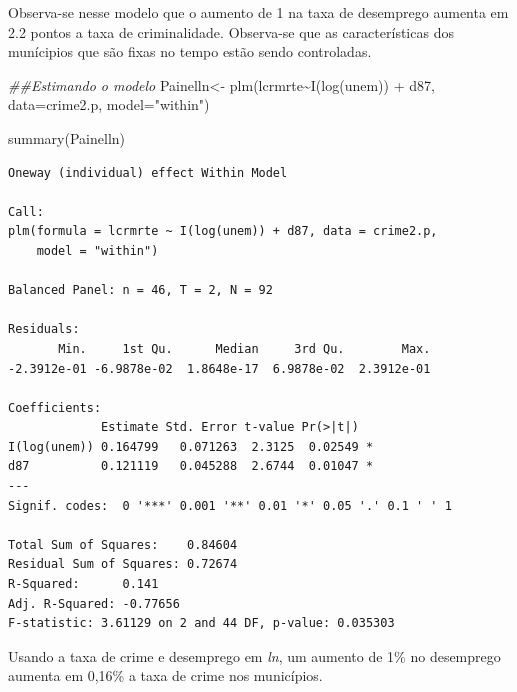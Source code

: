 \documentclass[
  letterpaper,
  DIV=11,
  numbers=noendperiod]{scrreprt}
\newenvironment{Shaded}{\begin{snugshade}}{\end{snugshade}}
\newcommand{\AttributeTok}[1]{\textcolor[rgb]{0.40,0.45,0.13}{#1}}
\newcommand{\DocumentationTok}[1]{\textcolor[rgb]{0.37,0.37,0.37}{\textit{#1}}}
\newcommand{\FunctionTok}[1]{\textcolor[rgb]{0.28,0.35,0.67}{#1}}
\newcommand{\NormalTok}[1]{\textcolor[rgb]{0.00,0.23,0.31}{#1}}
\newcommand{\OtherTok}[1]{\textcolor[rgb]{0.00,0.23,0.31}{#1}}
\newcommand{\SpecialCharTok}[1]{\textcolor[rgb]{0.37,0.37,0.37}{#1}}
\newcommand{\StringTok}[1]{\textcolor[rgb]{0.13,0.47,0.30}{#1}}
\begin{document}
Observa-se nesse modelo que o aumento de 1 na taxa de desemprego aumenta
em 2.2 pontos a taxa de criminalidade. Observa-se que as características
dos munícipios que são fixas no tempo estão sendo controladas.

\begin{Shaded}
\begin{Highlighting}[]
\DocumentationTok{\#\#Estimando o modelo}
\NormalTok{Painelln}\OtherTok{\textless{}{-}} \FunctionTok{plm}\NormalTok{(lcrmrte}\SpecialCharTok{\textasciitilde{}}\FunctionTok{I}\NormalTok{(}\FunctionTok{log}\NormalTok{(unem)) }\SpecialCharTok{+}\NormalTok{  d87, }\AttributeTok{data=}\NormalTok{crime2.p, }\AttributeTok{model=}\StringTok{"within"}\NormalTok{)}

\FunctionTok{summary}\NormalTok{(Painelln)}
\end{Highlighting}
\end{Shaded}

\begin{verbatim}
Oneway (individual) effect Within Model

Call:
plm(formula = lcrmrte ~ I(log(unem)) + d87, data = crime2.p, 
    model = "within")

Balanced Panel: n = 46, T = 2, N = 92

Residuals:
       Min.     1st Qu.      Median     3rd Qu.        Max. 
-2.3912e-01 -6.9878e-02  1.8648e-17  6.9878e-02  2.3912e-01 

Coefficients:
             Estimate Std. Error t-value Pr(>|t|)  
I(log(unem)) 0.164799   0.071263  2.3125  0.02549 *
d87          0.121119   0.045288  2.6744  0.01047 *
---
Signif. codes:  0 '***' 0.001 '**' 0.01 '*' 0.05 '.' 0.1 ' ' 1

Total Sum of Squares:    0.84604
Residual Sum of Squares: 0.72674
R-Squared:      0.141
Adj. R-Squared: -0.77656
F-statistic: 3.61129 on 2 and 44 DF, p-value: 0.035303
\end{verbatim}

Usando a taxa de crime e desemprego em \emph{ln}, um aumento de 1\% no
desemprego aumenta em 0,16\% a taxa de crime nos municípios.
\end{document}
